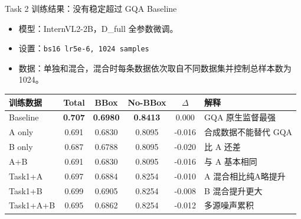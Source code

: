 \documentclass{beamer}
\newcommand{\smalltab}{\scriptsize}
\begin{document}
\begin{frame}{Task 2 训练结果：没有稳定超过 GQA Baseline}
\small
\begin{itemize}
\item 模型：InternVL2-2B，D\_full 全参数微调。
\item 设置：\texttt{bs16 lr5e-6, 1024 samples}
\item 数据：单独和混合，混合时每条数据依次取自不同数据集并控制总样本数为 1024。
\end{itemize}
\smalltab
\centering 
\begin{tabular}{p{}ccccp{}}
\toprule
训练数据 & Total & BBox & No-BBox & $\Delta$ & 解释 \\
\midrule
Baseline & \textbf{0.707} & \textbf{0.6980} & \textbf{0.8413} & 0.000 & GQA 原生监督最强 \\
A only & 0.691 & 0.6830 & 0.8095 & -0.016 & 合成数据不能替代 GQA \\
B only & 0.687 & 0.6788 & 0.8095 & -0.020 & 比 A 还差 \\
A+B & 0.691 & 0.6830 & 0.8095 & -0.016 & 与 A 基本相同 \\
Task1+A & 0.697 & 0.6884 & 0.8254 & -0.010 & A 混合相比纯A略提升 \\
Task1+B & 0.699 & 0.6905 & 0.8254 & -0.008 & B 混合提升更大 \\
Task1+A+B & 0.695 & 0.6862 & 0.8254 & -0.012 & 多源噪声累积 \\
\bottomrule
\end{tabular}
\end{frame}
\end{document}
